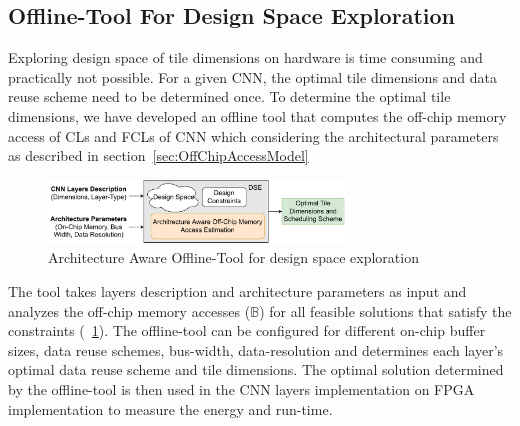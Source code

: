 \documentclass[a4paper,10pt]{article}
\newcommand{\numBytesOffChip}{\mathbb{B}}
\begin{document}
\subsection{Offline-Tool For Design Space Exploration}
 Exploring design space of tile dimensions on hardware is time consuming and practically not possible. For a given CNN, the optimal tile dimensions and data reuse scheme need to be determined once. To determine the optimal tile dimensions, we have developed an offline tool that computes the off-chip memory access of CLs and FCLs of CNN which considering the architectural parameters as described in section~\ref{sec:OffChipAccessModel}
 \begin{figure}[!htb]
 	\centering
 	\includegraphics[width=0.7\textwidth]{offlineFrameworkForCNN}
 	\caption{Architecture Aware Offline-Tool for design space exploration}
 	\label{fig:offlineFrameworkForCNN}
 \end{figure}
 The tool takes layers description and architecture parameters as input and analyzes the off-chip memory accesses ($\numBytesOffChip$) for all feasible solutions that satisfy the constraints (\figurename~\ref{fig:offlineFrameworkForCNN}). The offline-tool can be configured for different on-chip buffer sizes, data reuse schemes, bus-width, data-resolution and determines each layer's optimal data reuse scheme and tile dimensions. The optimal solution determined by the offline-tool is then used in the CNN layers implementation on FPGA implementation to measure the energy and run-time. 
\end{document}
